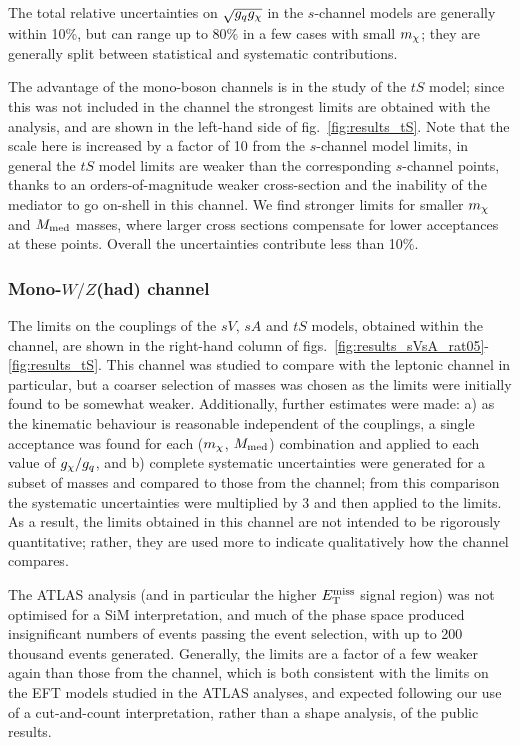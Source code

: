 The total relative uncertainties on $\sqrt{g_q g_{\chi}}$ in the $s$-channel models are generally within 10\%, but can range up to 80\% in a few cases with small $m_{\chi}$; they are generally split between statistical and systematic contributions.

The advantage of the mono-boson channels is in the study of the $tS$ model; since this was not included in the \monojet channel the strongest limits are obtained with the \monoZ analysis, and are shown in the left-hand side of fig.~\ref{fig:results_tS}. Note that the scale here is increased by a factor of 10 from the $s$-channel model limits, in general the $tS$ model limits are weaker than the corresponding $s$-channel points, thanks to an orders-of-magnitude weaker cross-section and the inability of the mediator to go on-shell in this channel. We find stronger limits for smaller $m_{\chi}$ and $M_{\mathrm{med}}$ masses, where larger cross sections compensate for lower acceptances at these points. Overall the uncertainties contribute less than 10\%.

\subsubsection{Mono-$W/Z$(had) channel}

The limits on the couplings of the $sV$, $sA$ and $tS$ models, obtained within the \monoWZ channel, are shown in the right-hand column of figs.~\ref{fig:results_sVsA_rat05}-\ref{fig:results_tS}. This channel was studied to compare with the leptonic \monoZ channel in particular, but a coarser selection of masses was chosen as the limits were initially found to be somewhat weaker. Additionally, further estimates were made: a) as the kinematic behaviour is reasonable independent of the couplings, a single acceptance was found for each ($m_{\chi}$, $M_{\mathrm{med}}$) combination and applied to each value of $g_{\chi} / g_q$, and b) complete systematic uncertainties were generated for a subset of masses and compared to those from the \monoZ channel; from this comparison the \monoZ systematic uncertainties were multiplied by 3 and then applied to the \monoWZ limits. As a result, the limits obtained in this channel are not intended to be rigorously quantitative; rather, they are used more to indicate qualitatively how the channel compares.

The ATLAS \monoWZ analysis (and in particular the higher $E_{\mathrm{T}}^{\mathrm{miss}}$ signal region) was not optimised for a SiM interpretation, and much of the phase space produced insignificant numbers of events passing the event selection, with up to 200 thousand events generated. Generally, the limits are a factor of a few weaker again than those from the \monoZ channel, which is both consistent with the limits on the EFT models studied in the ATLAS analyses, and expected following our use of a cut-and-count interpretation, rather than a shape analysis, of the \monoWZ public results.

